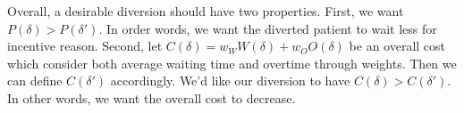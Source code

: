 Overall, a desirable diversion should have two properties. First, we want $P(\delta) > P(\delta')$. In order words, we want the diverted patient to wait less for incentive reason. Second, let $C(\delta) = w_W W(\delta) + w_O O(\delta)$ be an overall cost which consider both average waiting time and overtime through weights. Then we can define $C(\delta')$ accordingly. We'd like our diversion to have $C(\delta) > C(\delta')$. In other words, we want the overall cost to decrease.